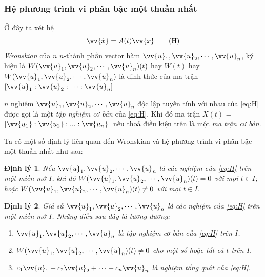 \documentclass[a4paper]{article}
\newtheorem{theorem}{{\bf Định lý}}
\begin{document}
\subsubsection{Hệ phương trình vi phân bậc một thuần nhất}
Ở đây ta xét hệ
\begin{equation}
    \vv{\dot{x}} = A(t)\vv{x}   \tag{H}\label{eq:H}
\end{equation}
\emph{Wronskian} của $n$ $n$-thành phần vector hàm $\vv{u}_1,\vv{u}_2,\cdots,\vv{u}_n$, ký hiệu là \sloppy $W(\vv{u}_1,\vv{u}_2,\cdots,\vv{u}_n)(t)$ hay $W(t)$ hay $W(\vv{u}_1,\vv{u}_2,\cdots,\vv{u}_n)$ là định thức của ma trận $[\vv{u}_1:\vv{u}_2:\cdots:\vv{u}_n]$ \par
$n$ nghiệm $\vv{u}_1,\vv{u}_2,\cdots,\vv{u}_n$ độc lập tuyến tính với nhau của \eqref{eq:H} được gọi là một \emph{tập nghiệm cơ bản} của \eqref{eq:H}. Khi đó ma trận $X(t)$ = $[\vv{u_1}: \vv{u_2}:...:\vv{u_n}]$ nếu thoả điều kiện trên là một \emph{ma trận cơ bản}. \par
Ta có một số định lý liên quan đến Wronskian và hệ phương trình vi phân bậc một thuần nhất như sau:
\begin{theorem}
    Nếu $\vv{u}_1,\vv{u}_2,\cdots,\vv{u}_n$ là các nghiệm của \eqref{eq:H} trên một miền mở $I$, khi đó 
    \sloppy $W(\vv{u}_1,\vv{u}_2,\cdots,\vv{u}_n)(t) = 0$ với mọi $t \in I$; hoặc $W(\vv{u}_1,\vv{u}_2,\cdots,\vv{u}_n)(t) \neq 0$ với mọi $t \in I$.
\end{theorem} \par
\begin{theorem}
    Giả sử $\vv{u}_1,\vv{u}_2,\cdots,\vv{u}_n$ là các nghiệm của \eqref{eq:H} trên một miền mở $I$. Những điều sau đây là tương đương:
    \begin{enumerate}[nolistsep,label=(\roman*)]
        \item  $\vv{u}_1,\vv{u}_2,\cdots,\vv{u}_n$ là tập nghiệm cơ bản của \eqref{eq:H} trên $I$.
        \item $W(\vv{u}_1,\vv{u}_2,\cdots,\vv{u}_n)(t) \neq 0$ cho một số hoặc tất cả $t$ trên $I$.
        \item $c_1\vv{u}_1+c_2\vv{u}_2+\cdots+c_n\vv{u}_n$ là nghiệm tổng quát của \eqref{eq:H}.
    \end{enumerate}
\end{theorem}
\end{document}
